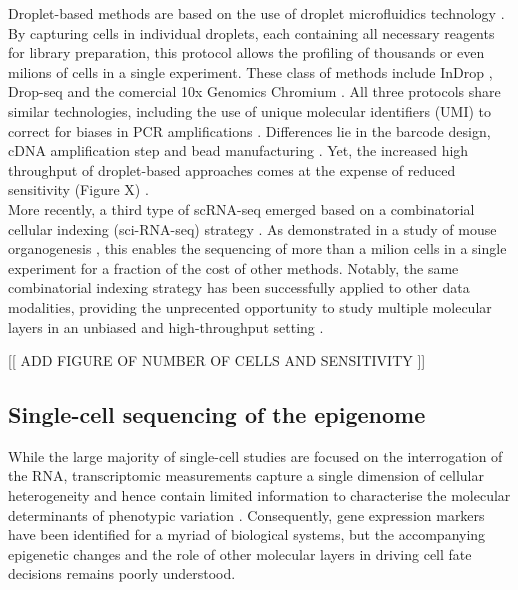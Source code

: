 Droplet-based methods are based on the use of droplet microfluidics technology \cite{Zhang2018}. By capturing cells in individual droplets, each containing all necessary reagents for library preparation, this protocol allows the profiling of thousands or even milions of cells in a single experiment. These class of methods include InDrop \cite{Klein2015,Zilionis2017}, Drop-seq\cite{Macosko2015} and the comercial 10x Genomics Chromium \cite{Zheng2017}. All three protocols share similar technologies, including the use of unique molecular identifiers (UMI) to correct for biases in PCR amplifications \cite{Kivioja2011}. Differences lie in the barcode design, cDNA amplification step and bead manufacturing \cite{Zhang2019}. Yet, the increased high throughput of droplet-based approaches comes at the expense of reduced sensitivity (Figure X) \cite{Ziegenhain2017}.\\

More recently, a third type of scRNA-seq emerged based on a combinatorial cellular indexing (sci-RNA-seq) strategy \cite{Cao2017}. As demonstrated in a study of mouse organogenesis \cite{Cao2019}, this enables the sequencing of more than a milion cells in a single experiment for a fraction of the cost of other methods. Notably, the same combinatorial indexing strategy has been successfully applied to other data modalities, providing the unprecented opportunity to study multiple molecular layers in an unbiased and high-throughput setting \cite{Vitak2017, Ramani2017, Mulqueen2018}.


[[ ADD FIGURE OF NUMBER OF CELLS AND SENSITIVITY ]]


\subsection{Single-cell sequencing of the epigenome}

While the large majority of single-cell studies are focused on the interrogation of the RNA, transcriptomic measurements capture a single dimension of cellular heterogeneity and hence contain limited information to characterise the molecular determinants of phenotypic variation \cite{??}. Consequently, gene expression markers have been identified for a myriad of biological systems, but the accompanying epigenetic changes and the role of other molecular layers in driving cell fate decisions remains poorly understood.

